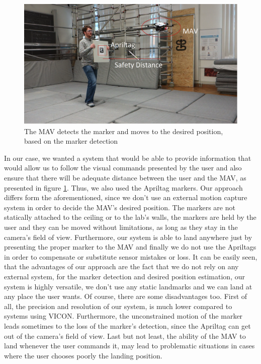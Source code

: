\begin{figure}
	\centering
	 \includegraphics[width=1.00\textwidth]{images/real_experiment_v1.pdf}
	 \caption{The MAV detects the marker and moves to the desired position, based on the marker detection}
	 \label{pics:experimentCapture}
\end{figure}

In our case, we wanted a system that would be able to provide information that would allow us to follow the visual commands presented by the user and also ensure that there will be adequate distance between the user and the MAV, as presented in figure \ref{pics:experimentCapture}. Thus, we also used the Apriltag markers. Our approach differs form the aforementioned, since we don't use an external motion capture system in order to decide the MAV's desired position. The markers are not statically attached to the ceiling or to the lab's walls, the markers are held by the user and they can be moved without limitations, as long as they stay in the camera's field of view. Furthermore, our system is able to land anywhere just by presenting the proper marker to the MAV and finally we do not use the Apriltags in order to compensate or substitute sensor mistakes or loss. It can be easily seen, that the advantages of our approach are the fact that we do not rely on any external system, for the marker detection and desired position estimation, our system is highly versatile, we don't use any static landmarks and we can land at any place the user wants. Of course, there are some disadvantages too.  First of all, the precision and resolution of our system, is much lower compared to systems using VICON. Furthermore, the unconstrained motion of the marker leads sometimes to the loss of the marker's detection, since the Apriltag can get out of the camera's field of view. Last but not least, the ability of the MAV to land whenever the user commands it, may lead to problematic situations in cases where the user chooses poorly the landing position.


  
  
  
  
  
  
  


